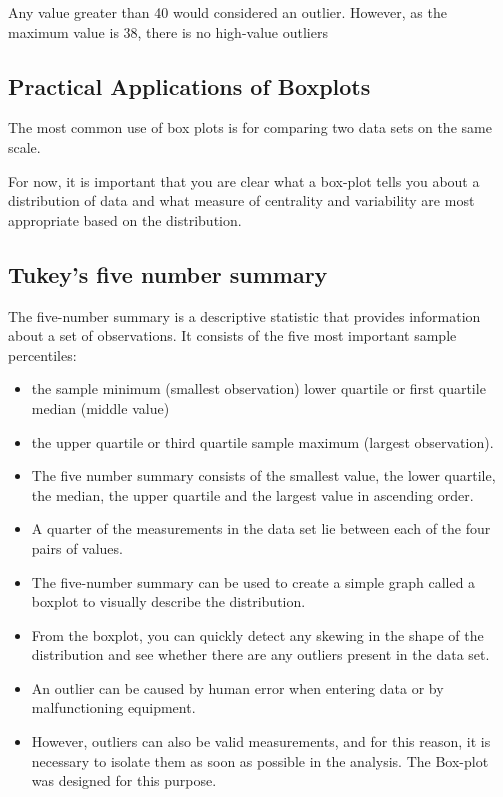 ﻿\documentclass[]{report}
\begin{document}
Any value greater than 40 would considered an outlier. However, as the maximum value is 38, there is no high-value outliers




\subsection{Practical Applications of Boxplots}

The most common use of box plots is for comparing two data sets on the same scale. 

For now, it is important that you are clear what a box-plot tells you about a distribution of data and what measure of centrality and variability are most appropriate based on the distribution.

\subsection*{Tukey's five number summary}
The five-number summary is a descriptive statistic that provides information about a set of observations. It consists of the five most important sample percentiles:
\begin{itemize}
\item the sample minimum (smallest observation)
\itemthe lower quartile or first quartile
\itemthe median (middle value)
\item the upper quartile or third quartile
\itemthe sample maximum (largest observation).
\end{itemize}


\begin{itemize}
\item The five number summary consists of the smallest value, the lower quartile, the median, the upper quartile and the largest value in ascending order.

\item A quarter of the measurements in the data set lie between each of the four pairs of values. 

\item The five-number summary can be used to create a simple graph called a boxplot to visually describe the distribution.

\item From the boxplot, you can quickly detect any skewing in the shape of the distribution and see whether there are any outliers present in the data set.

\item An outlier can be caused by human error when entering data or by malfunctioning equipment. 

\item However, outliers can also be valid measurements, and for this reason, it is necessary to isolate them as soon as possible in the analysis. The Box-plot was designed for this purpose.
\end{itemize}
\end{document}
